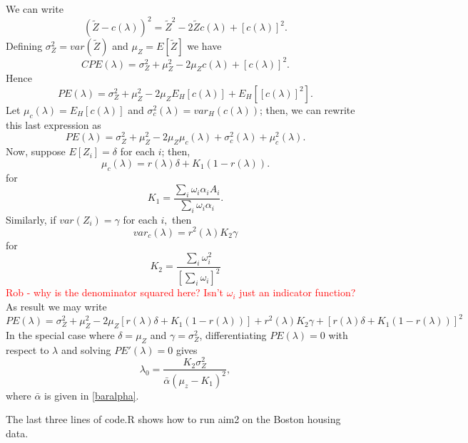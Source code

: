 \documentclass[12pt]{article}
\begin{document}
We can write
\[
(\tilde Z - c(\lambda))^2 = \tilde Z^2 - 2 \tilde Z c(\lambda) + [c(\lambda)]^2.
\]
Defining $\sigma^2_Z = var(\tilde Z)$ and $\mu_Z = E[\tilde Z]$ we have
\[
CPE(\lambda) = \sigma^2_Z + \mu^2_Z - 2 \mu_Z c(\lambda) + [c(\lambda)]^2.
\]
Hence
\[
PE(\lambda) = \sigma^2_Z + \mu^2_Z - 2 \mu_Z E_H[c(\lambda)] + E_H[[c(\lambda)]^2].
\]
Let $\mu_c(\lambda) = E_H[c(\lambda)] $ and $\sigma^2_c(\lambda) =
var_H(c(\lambda))$; then, we can rewrite this last expression as
\[
PE(\lambda) = \sigma^2_Z + \mu^2_Z - 2 \mu_Z \mu_c(\lambda) + \sigma^2_c(\lambda) + \mu^2_c(\lambda).
\]
Now, suppose $E[Z_i] = \delta$ for each $i$; then,
\[
\mu_c(\lambda) = r(\lambda) \delta+ K_1 (1-r(\lambda)).
\]
for
\[
K_1 =  \frac{ \sum_i \omega_i \alpha_i A_i}{ \sum_i \omega_i \alpha_i }.
\]
Similarly, if $var(Z_i) = \gamma$ for each $i,$ then
\[
var_c(\lambda) = r^2(\lambda) K_2 \gamma
\]
for 
\[
K_2 = \frac{ \sum_i \omega_i^2 }{[ \sum_i \omega_i]^2}
\] \textcolor{red}{Rob - why is the denominator squared here? Isn't $\omega_i$ just an indicator function?}
As result we may write
\[
PE(\lambda) = \sigma^2_Z + \mu^2_Z - 2 \mu_Z [r(\lambda) \delta + K_1 (1-r(\lambda)) ] + 
r^2(\lambda) K_2 \gamma + 
[r(\lambda) \delta + K_1 (1-r(\lambda))]^2
\]
In the special case where $\delta = \mu_Z$ and $\gamma = \sigma^2_Z$,
differentiating $PE(\lambda) = 0$ with respect to $\lambda$ and
solving $PE'(\lambda) = 0$ gives
\begin{equation}
\label{lam-opt}
\lambda_0 = \frac{K_2 \sigma^2_Z}{ \bar{\alpha} (\mu_z - K_1)^2},
\end{equation}
where $\bar \alpha$ is given in \eqref{baralpha}.

The last three lines of code.R shows how to run aim2 on the Boston
housing data.
\end{document}
